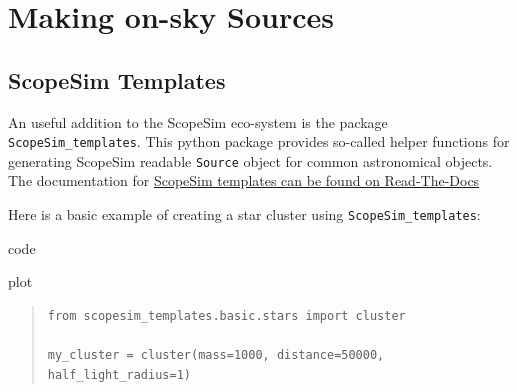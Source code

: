 

\section{Making on-sky Sources%
  \label{making-on-sky-sources}%
}


\subsection{ScopeSim Templates%
  \label{scopesim-templates}%
}

An useful addition to the ScopeSim eco-system is the package \texttt{ScopeSim\_templates}.
This python package provides so-called helper functions for generating ScopeSim readable \texttt{Source} object for common astronomical objects.
The documentation for \href{https://scopesim-templates.readthedocs.io/en/latest/}{ScopeSim templates can be found on Read-The-Docs}

Here is a basic example of creating a star cluster using \texttt{ScopeSim\_templates}:

\label{code-scopesim-templates-example}
\begin{DUclass}{code}
\begin{DUclass}{plot}
\begin{quote}
\begin{alltt}
\begin{lstlisting}[frame=single]
from scopesim_templates.basic.stars import cluster

my_cluster = cluster(mass=1000, distance=50000, half_light_radius=1)
\end{lstlisting}
\end{alltt}
\end{quote}
\end{DUclass}
\end{DUclass}


